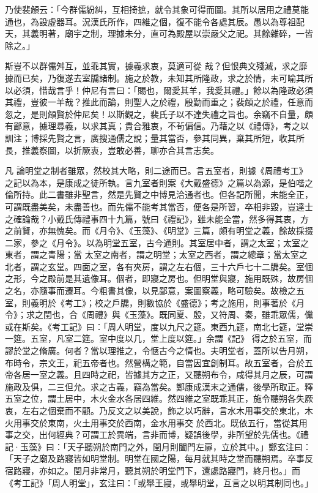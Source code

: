 \begin{pinyinscope}
 乃使裴頠云：「今群儒紛糾，互相掎摭，就令其象可得而圖。其所以居用之禮莫能通也，為設虛器耳。況漢氏所作，四維之個，復不能令各處其辰。愚以為尊祖配天，其義明著，廟宇之制，理據未分，直可為殿屋以崇嚴父之祀。其餘雜碎，一皆除之。」



 斯豈不以群儒舛互，並乖其實，據義求衷，莫適可從
 哉？但恨典文殘滅，求之靡據而已矣，乃復遂去室牖諸制。施之於教，未知其所隆政，求之於情，未可喻其所以必須，惜哉言乎！仲尼有言曰：「賜也，爾愛其羊，我愛其禮。」餘以為隆政必須其禮，豈彼一羊哉？推此而論，則聖人之於禮，殷勤而重之；裴頠之於禮，任意而忽之，是則頠賢於仲尼矣！以斯觀之，裴氏子以不達失禮之旨也。余竊不自量，頗有鄙意，據理尋義，以求其真；貴合雅衷，不茍偏信。乃藉之以《禮傳》，考之以訓注；博採先賢之言，廣搜通儒之說；量其當否，參其同異，棄其所短，收其所長，推義察圖，以折厥衷，豈敢必善，聊亦合其言志矣。



 凡
 論明堂之制者雖眾，然校其大略，則二途而已。言五室者，則據《周禮考工》之記以為本，是康成之徒所執。言九室者則案《大戴盛德》之篇以為源，是伯喈之倫所持。此二書雖非聖言，然是先賢之中博見洽通者也。但各記所聞，未能全正，可謂既盡美矣，未盡善也。而先儒不能考其當否，便各是所習，卒相非毀，豈達士之確論哉？小戴氏傳禮事四十九篇，號曰《禮記》，雖未能全當，然多得其衷，方之前賢，亦無愧矣。而《月令》、《玉藻》、《明堂》三篇，頗有明堂之義，餘故採掇二家，參之《月令》。以為明堂五室，古今通則。其室居中者，謂之太室；太室之東者，謂之青陽；當
 太室之南者，謂之明堂；太室之西者，謂之總章；當太室之北者，謂之玄堂。四面之室，各有夾房，謂之左右個，三十六戶七十二牖矣。室個之形，今之殿前是其遺像耳。個者，即寢之房也。但明堂與寢，施用既殊，故房個之名，亦隨事而遷耳。今粗書其像，以見鄙意，案圖察義，略可驗矣。故檢之五室，則義明於《考工》；校之戶牖，則數協於《盛德》；考之施用，則事著於《月令》；求之閏也，合《周禮》與《玉藻》。既同夏、殷，又符周、秦，雖乖眾儒，儻或在斯矣。《考工記》曰：「周人明堂，度以九尺之筵。東西九筵，南北七筵，堂崇一筵。五室，凡室二筵。室中度以几，堂上度以筵。」余謂《記》
 得之於五室，而謬於堂之脩廣。何者？當以理推之，令愜古今之情也。夫明堂者，蓋所以告月朔，布時令，宗文王，祀五帝者也。然營構之範，自當因宜創制耳。故五室者，合於五帝各居一室之義。且四時之祀，皆據其方之正，又聽朔布令，咸得其月之辰，可謂施政及俱，二三但允。求之古義，竊為當矣。鄭康成漢末之通儒，後學所取正。釋五室之位，謂土居中，木火金水各居四維。然四維之室既乖其正，施令聽朔各失厥衷，左右之個棄而不顧。乃反文之以美說，飾之以巧辭，言水木用事交於東北，木火用事交於東南，火土用事交於西南，金水用事交
 於西北。既依五行，當從其用事之交，出何經典？可謂工於異端，言非而博，疑誤後學，非所望於先儒也。《禮記·玉藻》曰：「天子聽朔於南門之外，閏月則闔門左扉，立於其中。」鄭玄注曰：「天子之廟及路寢皆如明堂制。明堂在國之陽，每月就其時之堂而聽朔焉。卒事反宿路寢，亦如之。閏月非常月，聽其朔於明堂門下，還處路寢門，終月也。」而《考工記》「周人明堂」，玄注曰：「或舉王寢，或舉明堂，互言之以明其制同也。」




\end{pinyinscope}
